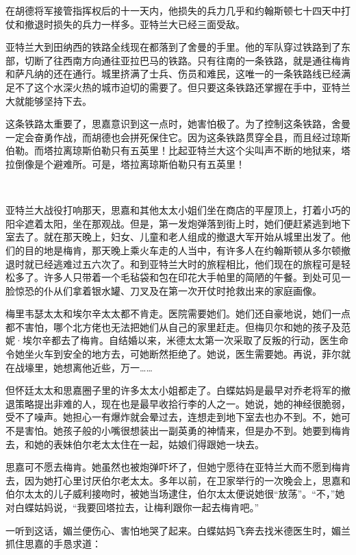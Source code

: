 \par 在胡德将军接管指挥权后的十一天内，他损失的兵力几乎和约翰斯顿七十四天中打仗和撤退时损失的兵力一样多。亚特兰大已经三面受敌。
\par 亚特兰大到田纳西的铁路全线现在都落到了舍曼的手里。他的军队穿过铁路到了东部，切断了往西南方向通往亚拉巴马的铁路。只有往南的一条铁路，就是通往梅肯和萨凡纳的还在通行。城里挤满了士兵、伤员和难民，这唯一的一条铁路线已经满足不了这个水深火热的城市迫切的需要了。但只要这条铁路还掌握在手中，亚特兰大就能够坚持下去。
\par 这条铁路太重要了，思嘉意识到这一点时，她害怕极了。为了控制这条铁路，舍曼一定会奋勇作战，而胡德也会拼死保住它。因为这条铁路贯穿全县，而且经过琼斯伯勒。而塔拉离琼斯伯勒只有五英里！比起亚特兰大这个尖叫声不断的地狱来，塔拉倒像是个避难所。可是，塔拉离琼斯伯勒只有五英里！
\par  
\par 亚特兰大战役打响那天，思嘉和其他太太小姐们坐在商店的平屋顶上，打着小巧的阳伞遮着太阳，坐在那观战。但是，第一发炮弹落到街上时，她们便赶紧逃到地下室去了。就在那天晚上，妇女、儿童和老人组成的撤退大军开始从城里出发了。他们的目的地是梅肯，那天晚上乘火车走的人当中，有许多人在约翰斯顿从多尔顿撤退时就已经逃难过五六次了。和到亚特兰大时的旅程相比，他们现在的旅程可是轻松多了。许多人只带着一个毛毡袋和包在印花大手帕里的简陋的午餐。到处可见一脸惊恐的仆从们拿着银水罐、刀叉及在第一次开仗时抢救出来的家庭画像。
\par 梅里韦瑟太太和埃尔辛太太都不肯走。医院需要她们。她们还自豪地说，她们一点都不害怕，哪个北方佬也无法把她们从自己的家里赶走。但梅贝尔和她的孩子及范妮·埃尔辛都去了梅肯。自结婚以来，米德太太第一次采取了反叛的行动，医生命令她坐火车到安全的地方去，可她断然拒绝了。她说，医生需要她。再说，菲尔就在战壕里，她想离他近些，万一……
\par 但怀廷太太和思嘉圈子里的许多太太小姐都走了。白蝶姑妈是最早对乔老将军的撤退策略提出非难的人，现在也是最早收拾行李的人之一。她说，她的神经很脆弱，受不了噪声。她担心一有爆炸就会晕过去，连想走到地下室去也办不到。不，她可不是害怕。她孩子般的小嘴很想装出一副英勇的神情来，但是办不到。她要到梅肯去，和她的表妹伯尔老太太住在一起，姑娘们得跟她一块去。
\par 思嘉可不愿去梅肯。她虽然也被炮弹吓坏了，但她宁愿待在亚特兰大而不愿到梅肯去，因为她打心里讨厌伯尔老太太。多年以前，在卫家举行的一次晚会上，思嘉和伯尔太太的儿子威利接吻时，被她当场逮住，伯尔太太便说她很“放荡”。“不，”她对白蝶姑妈说，“我要回塔拉去，让梅利跟你一起去梅肯吧。”
\par 一听到这话，媚兰便伤心、害怕地哭了起来。白蝶姑妈飞奔去找米德医生时，媚兰抓住思嘉的手恳求道：
